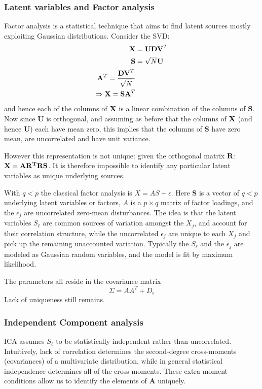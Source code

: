 \subsubsection{Latent variables and Factor analysis}
Factor analysis is a statistical technique that aims to find latent sources mostly exploiting Gaussian distributions.
Consider the SVD:
\begin{equation}
\begin{aligned}
\mathrm{\mathbf{X}} &= \mathbf{UDV}^T\\
\mathbf{S} &= \sqrt{N}\mathbf{U}\\
\mathbf{A}^T = \frac{\mathbf{DV}^T}{\sqrt{N}}\\
\Rightarrow \mathrm{\mathbf{X}} = \mathbf{SA}^T
\end{aligned}
\end{equation}
and hence each of the columns of $\mathrm{\mathbf{X}}$ is a linear combination of the columns of $\mathbf{S}$. Now since $\mathbf{U}$ is orthogonal, and assuming as before that the columns of $\mathrm{\mathbf{X}}$ (and hence $\mathbf{U}$) each have mean zero, this implies that the columns of $\mathbf{S}$ have zero mean, are uncorrelated and have unit variance.

However this representation is not unique: given the orthogonal matrix $\mathbf{R}$: $\mathrm{\mathbf{X}} = \mathbf{AR^TRS}$.  It is therefore impossible to identify any particular latent variables as unique underlying sources.

With $q<p$ the classical factor analysis is $X = AS + \epsilon$. Here $\mathbf{S}$ is a vector of $q < p$ underlying latent variables or factors, $A$ is a $p \times q$ matrix of factor loadings, and the $\epsilon_j$ are uncorrelated zero-mean disturbances. The idea is that the latent variables $S_\ell$ are common sources of variation amongst the $X_j$, and account for their correlation structure, while the uncorrelated $\epsilon_j$ are unique to each $X_j$ and pick up the remaining unaccounted variation. Typically the $S_\ell$ and the $\epsilon_j$ are modeled as Gaussian random variables, and the model is fit by maximum likelihood.

The parameters all reside in the covariance matrix
\begin{equation}
\Sigma = AA^T +D_\epsilon
\end{equation}
Lack of uniqueness still remains.

\subsubsection{Independent Component analysis}
ICA assumes $S_\ell$ to be statistically independent rather than uncorrelated. Intuitively, lack of correlation determines the second-degree cross-moments (covariances) of a multivariate distribution, while in general statistical independence determines all of the cross-moments. These extra moment conditions allow us to identify the elements of $\mathbf{A}$ uniquely.

